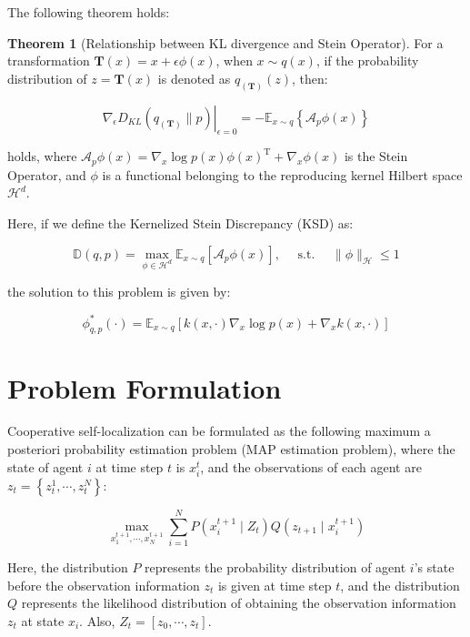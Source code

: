 \documentclass[a4paper,fleqn,10pt,twocolumn]{SICE_ISCS}
\begin{document}
The following theorem holds:

\textbf{Theorem 1} (Relationship between KL divergence and Stein Operator\cite{SVGD}). For a transformation $\boldsymbol{T}(x)=x+\epsilon \phi(x)$, when $x \sim q(x)$, if the probability distribution of $z=\boldsymbol{T}(x)$ is denoted as $q_{(\boldsymbol{T})}(z)$, then:

\begin{equation}
\nabla_{\epsilon} D_{K L}\left(\left.q_{(\boldsymbol{T})} \| p\right)\right|_{\epsilon=0}=-\mathbb{E}_{x \sim q}\left\{\mathcal{A}_{p} \phi(x)\right\}
\end{equation}

holds, where $\mathcal{A}_{p} \phi(x)=\nabla_{x} \log p(x) \phi(x)^{\mathrm{T}}+\nabla_{x} \phi(x)$ is the Stein Operator, and $\phi$ is a functional belonging to the reproducing kernel Hilbert space $\mathcal{H}^{d}$.

Here, if we define the Kernelized Stein Discrepancy (KSD) as:

\begin{equation}
\mathbb{D}(q, p)=\max _{\phi \in \mathcal{H}^{d}} \mathbb{E}_{x \sim q}\left[\mathcal{A}_{p} \phi(x)\right], \quad \text { s.t. } \quad\|\phi\|_{\mathcal{H}} \leq 1
\end{equation}

the solution to this problem is given by:

\begin{equation}
\phi_{q, p}^{*}(\cdot)=\mathbb{E}_{x \sim q}\left[k(x, \cdot) \nabla_{x} \log p(x)+\nabla_{x} k(x, \cdot)\right]
\end{equation}

\section{Problem Formulation}
Cooperative self-localization can be formulated as the following maximum a posteriori probability estimation problem (MAP estimation problem), where the state of agent $i$ at time step $t$ is $x_{i}^{t}$, and the observations of each agent are $z_{t}=\left\{z_{t}^{1}, \cdots, z_{t}^{N}\right\}$:

\begin{equation}
\max _{x_{1}^{t+1}, \cdots, x_{N}^{t+1}} \sum_{i=1}^{N} P\left(x_{i}^{t+1} \mid Z_{t}\right) Q\left(z_{t+1} \mid x_{i}^{t+1}\right)
\end{equation}

Here, the distribution $P$ represents the probability distribution of agent $i$'s state before the observation information $z_{t}$ is given at time step $t$, and the distribution $Q$ represents the likelihood distribution of obtaining the observation information $z_{t}$ at state $x_{i}$. Also, $Z_{t}=\left[z_{0}, \cdots, z_{t}\right]$.
\end{document}
